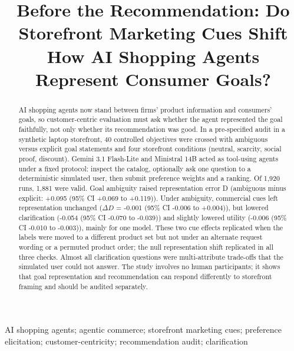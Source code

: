 \documentclass[conference]{IEEEtran}
\begin{document}
\title{Before the Recommendation: Do Storefront Marketing Cues Shift How AI Shopping Agents Represent Consumer Goals?}

\author{
}

\maketitle

\begin{abstract}
AI shopping agents now stand between firms' product information and consumers' goals, so customer-centric evaluation must ask whether the agent represented the goal faithfully, not only whether its recommendation was good. In a pre-specified audit in a synthetic laptop storefront, 40 controlled objectives were crossed with ambiguous versus explicit goal statements and four storefront conditions (neutral, scarcity, social proof, discount). Gemini 3.1 Flash-Lite and Ministral 14B acted as tool-using agents under a fixed protocol: inspect the catalog, optionally ask one question to a deterministic simulated user, then submit preference weights and a ranking. Of 1,920 runs, 1,881 were valid. Goal ambiguity raised representation error D (ambiguous minus explicit: +0.095 (95\% CI +0.069 to +0.119)). Under ambiguity, commercial cues left representation unchanged ($\Delta D$ = -0.001 (95\% CI -0.006 to +0.004)), but lowered clarification (-0.054 (95\% CI -0.070 to -0.039)) and slightly lowered utility (-0.006 (95\% CI -0.010 to -0.003)), mainly for one model. These two cue effects replicated when the labels were moved to a different product set but not under an alternate request wording or a permuted product order; the null representation shift replicated in all three checks. Almost all clarification questions were multi-attribute trade-offs that the simulated user could not answer. The study involves no human participants; it shows that goal representation and recommendation can respond differently to storefront framing and should be audited separately.
\end{abstract}

\begin{IEEEkeywords}
AI shopping agents; agentic commerce; storefront marketing cues; preference elicitation; customer-centricity; recommendation audit; clarification
\end{IEEEkeywords}
\end{document}
